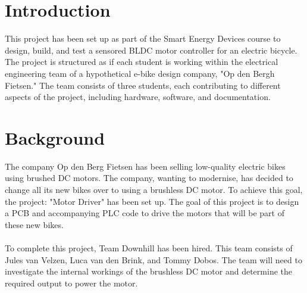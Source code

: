 \section{Introduction}
This project has been set up as part of the Smart Energy Devices course to design, build, and test a sensored BLDC motor controller for an electric bicycle. The project is structured as if each student is working within the electrical engineering team of a hypothetical e-bike design company, "Op den Bergh Fietsen." The team consists of three students, each contributing to different aspects of the project, including hardware, software, and documentation.


\section{Background}
The company Op den Berg Fietsen has been selling low-quality electric bikes using brushed DC motors. The company, wanting to modernise, has decided to change all its new bikes over to using a brushless DC motor. To achieve this goal, the project: "Motor Driver" has been set up. The goal of this project is to design a PCB and accompanying PLC code to drive the motors that will be part of these new bikes.\\
\\
To complete this project, Team Downhill has been hired. This team consists of Jules van Velzen, Luca van den Brink, and
Tommy Dobos. The team will need to investigate the internal workings of the brushless DC motor and determine the required output to power the motor.







\begin{comment}
Infra Vroom is de naam van een dynamisch team bestaande uit vier teamleden, Francisco Ramirez, Laurens van der Drift, Tommy Dobos en Justin van der Reijden.

Er is een opdracht gegeven door Dhiraj Djairam om een met sensoren bestuurd zelfrijdende auto te bouwen. Om een beter overzicht te behouden van dit proces zal in dit verslag continu een documentatie van het proces bijgehouden worden. Het idee achter dit project is om het proces van het bouwen van de auto te begrijpen en eventuele obstakels te analyseren en te begrijpen. De documentatie van dit proces moet zodanig geanalyseerd worden dat bij het tegenkomen van een probleem het makkelijk omzeilt kan worden. Het doel van dit project is met name het zo veel mogelijk ontwikkelen van onze vaardigheden. Om de functionaliteit en een doeltreffend groepswerk te garanderen, moet een leider worden toegewezen. Daarom is Laurens van de Drift als leider toegewezen om het succes van het proces waarborgen. De taak van de projectleider is het proces in goede banen leiden en de groep tot het einde van het project begeleiden.
\end{comment}